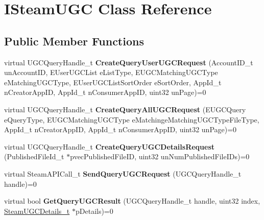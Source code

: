 \hypertarget{classISteamUGC}{}\section{I\+Steam\+U\+G\+C Class Reference}
\label{classISteamUGC}
\subsection*{Public Member Functions}
\begin{DoxyCompactItemize}
\item 
\hypertarget{classISteamUGC_a701e96d732942eab2ebc3d86965b98db}{}virtual U\+G\+C\+Query\+Handle\+\_\+t {\bfseries Create\+Query\+User\+U\+G\+C\+Request} (Account\+I\+D\+\_\+t un\+Account\+I\+D, E\+User\+U\+G\+C\+List e\+List\+Type, E\+U\+G\+C\+Matching\+U\+G\+C\+Type e\+Matching\+U\+G\+C\+Type, E\+User\+U\+G\+C\+List\+Sort\+Order e\+Sort\+Order, App\+Id\+\_\+t n\+Creator\+App\+I\+D, App\+Id\+\_\+t n\+Consumer\+App\+I\+D, uint32 un\+Page)=0\label{classISteamUGC_a701e96d732942eab2ebc3d86965b98db}

\item 
\hypertarget{classISteamUGC_ab7bba235c8ef89d8d7d3a98f0ed2e64e}{}virtual U\+G\+C\+Query\+Handle\+\_\+t {\bfseries Create\+Query\+All\+U\+G\+C\+Request} (E\+U\+G\+C\+Query e\+Query\+Type, E\+U\+G\+C\+Matching\+U\+G\+C\+Type e\+Matchinge\+Matching\+U\+G\+C\+Type\+File\+Type, App\+Id\+\_\+t n\+Creator\+App\+I\+D, App\+Id\+\_\+t n\+Consumer\+App\+I\+D, uint32 un\+Page)=0\label{classISteamUGC_ab7bba235c8ef89d8d7d3a98f0ed2e64e}

\item 
\hypertarget{classISteamUGC_ad369c4e6eecc09dfc76b494254d330f6}{}virtual U\+G\+C\+Query\+Handle\+\_\+t {\bfseries Create\+Query\+U\+G\+C\+Details\+Request} (Published\+File\+Id\+\_\+t $\ast$pvec\+Published\+File\+I\+D, uint32 un\+Num\+Published\+File\+I\+Ds)=0\label{classISteamUGC_ad369c4e6eecc09dfc76b494254d330f6}

\item 
\hypertarget{classISteamUGC_ad3670cfa5bca882a679fb9bd339020f3}{}virtual Steam\+A\+P\+I\+Call\+\_\+t {\bfseries Send\+Query\+U\+G\+C\+Request} (U\+G\+C\+Query\+Handle\+\_\+t handle)=0\label{classISteamUGC_ad3670cfa5bca882a679fb9bd339020f3}

\item 
\hypertarget{classISteamUGC_a1020425f4dfb254e253884390326dbe2}{}virtual bool {\bfseries Get\+Query\+U\+G\+C\+Result} (U\+G\+C\+Query\+Handle\+\_\+t handle, uint32 index, \hyperlink{structSteamUGCDetails__t}{Steam\+U\+G\+C\+Details\+\_\+t} $\ast$p\+Details)=0\label{classISteamUGC_a1020425f4dfb254e253884390326dbe2}


\end{DoxyCompactItemize}
